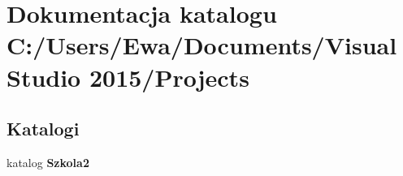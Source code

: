 \section{Dokumentacja katalogu C\+:/\+Users/\+Ewa/\+Documents/\+Visual Studio 2015/\+Projects}
\label{dir_9c527d655c41d0c627de2ada6ef6844d}
\subsection*{Katalogi}
\begin{DoxyCompactItemize}
\item 
katalog \textbf{ Szkola2}
\end{DoxyCompactItemize}
